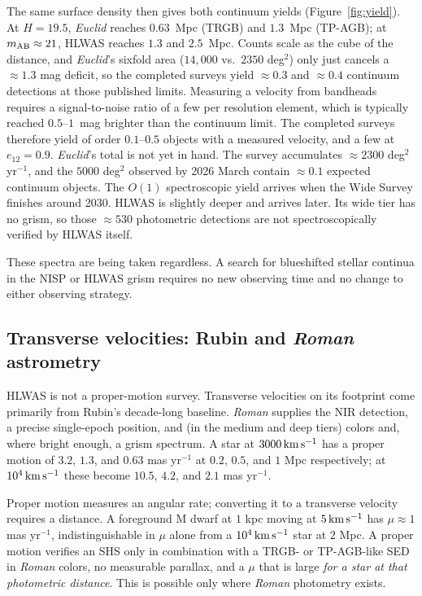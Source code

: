 \documentclass[twocolumn]{aastex701}
\newcommand{\kms}{\,{\rm km\,s^{-1}}}
\begin{document}
The same surface density then gives both continuum yields
(Figure~\ref{fig:yield}). At $H=19.5$, \textit{Euclid} reaches $0.63$~Mpc
(TRGB) and $1.3$~Mpc (TP-AGB); at $m_{\rm AB}\approx21$, HLWAS reaches
$1.3$ and $2.5$~Mpc. Counts scale as the cube of the distance, and
\textit{Euclid}'s sixfold area ($14{,}000$ vs.\ $2350$ deg$^{2}$) only just
cancels a $\approx1.3$ mag deficit, so the completed surveys yield
$\approx0.3$ and $\approx0.4$ continuum detections at those published
limits. Measuring a velocity from bandheads requires a signal-to-noise ratio of a
few per resolution element, which is typically reached $0.5$--$1$~mag
brighter than the continuum limit. The completed surveys therefore yield of
order $0.1$--$0.5$ objects with a measured velocity, and a few at
$e_{12}=0.9$. \textit{Euclid}'s total is not yet in hand. The survey accumulates
$\approx2300$ deg$^{2}$ yr$^{-1}$, and the $5000$ deg$^{2}$ observed by 2026
March contain $\approx0.1$ expected continuum objects. The $O(1)$
spectroscopic yield arrives when the Wide Survey finishes around 2030. HLWAS is slightly deeper and
arrives later. Its wide tier has no grism, so those $\approx530$ photometric
detections are not spectroscopically verified by HLWAS itself.

These spectra are being taken regardless. A
search for blueshifted stellar continua in the NISP or HLWAS grism requires
no new observing time and no change to either observing strategy.

\subsection{Transverse velocities: Rubin and \textit{Roman} astrometry}

HLWAS is not a proper-motion survey. Transverse velocities on its footprint
come primarily from Rubin's decade-long baseline. \textit{Roman} supplies
the NIR detection, a precise single-epoch position, and (in the medium and
deep tiers) colors and, where bright enough, a grism spectrum. A star at
$3000\kms$ has a proper motion of $3.2$, $1.3$, and $0.63$ mas yr$^{-1}$ at
$0.2$, $0.5$, and $1$ Mpc respectively; at $10^{4}\kms$ these become $10.5$,
$4.2$, and $2.1$ mas yr$^{-1}$.

Proper motion measures an angular rate; converting it to a transverse
velocity requires a distance. A foreground M dwarf at $1$ kpc moving at
$5\kms$ has $\mu\approx1$ mas yr$^{-1}$, indistinguishable in $\mu$ alone
from a $10^{4}\kms$ star at $2$ Mpc. A proper motion verifies an SHS only
in combination with a TRGB- or TP-AGB-like SED in \textit{Roman} colors, no
measurable parallax, and a $\mu$ that is large \emph{for a star at that
photometric distance}. This is possible only where \textit{Roman} photometry
exists.
\end{document}
